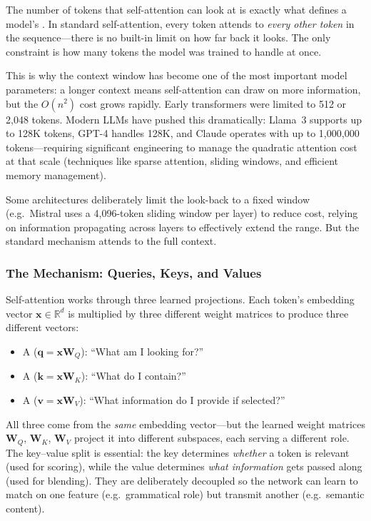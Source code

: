\begin{keyinsight}
The number of tokens that self-attention can look at is exactly what
defines a model's . In standard self-attention,
every token attends to \emph{every other token} in the
sequence---there is no built-in limit on how far back it looks. The
only constraint is how many tokens the model was trained to handle
at once.

This is why the context window has become one of the most important
model parameters: a longer context means self-attention can draw on
more information, but the $O(n^2)$ cost grows rapidly.
Early transformers were limited to 512 or 2{,}048 tokens.
Modern LLMs have pushed this dramatically:
Llama~3 supports up to 128K tokens, GPT-4 handles 128K, and
Claude operates with up to 1{,}000{,}000 tokens---requiring
significant engineering to manage the quadratic attention cost at
that scale (techniques like sparse attention, sliding windows, and
efficient memory management).

Some architectures deliberately limit the look-back to a fixed
window (e.g.\ Mistral uses a 4{,}096-token sliding window per
layer) to reduce cost, relying on information propagating across layers to
effectively extend the range. But the standard mechanism attends to
the full context.
\end{keyinsight}

\subsubsection{The Mechanism: Queries, Keys, and Values}

Self-attention works through three learned projections. Each token's
embedding vector $\bm{x} \in \mathbb{R}^d$ is multiplied by three
different weight matrices to produce three different vectors:

\begin{itemize}[leftmargin=2em]
  \item A  ($\bm{q} = \bm{x}\bm{W}_Q$): ``What am I looking for?''
  \item A  ($\bm{k} = \bm{x}\bm{W}_K$): ``What do I contain?''
  \item A  ($\bm{v} = \bm{x}\bm{W}_V$): ``What information do I
    provide if selected?''
\end{itemize}

All three come from the \emph{same} embedding vector---but the learned
weight matrices $\bm{W}_Q$, $\bm{W}_K$, $\bm{W}_V$ project it into
different subspaces, each serving a different role. The key--value
split is essential: the key determines \emph{whether} a token is
relevant (used for scoring), while the value determines \emph{what
information} gets passed along (used for blending). They are
deliberately decoupled so the network can learn to match on one
feature (e.g.\ grammatical role) but transmit another (e.g.\ semantic
content).

